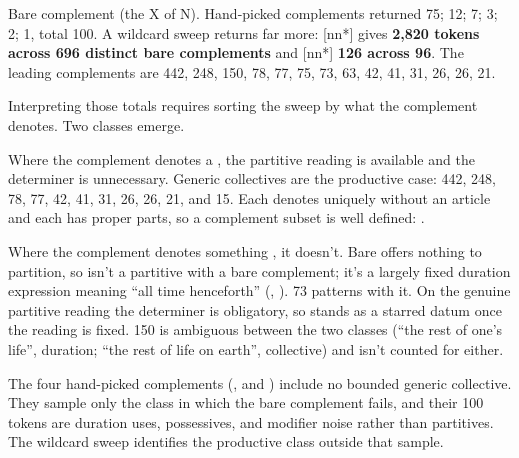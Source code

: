 Bare complement (the X of N). Hand-picked complements returned  75;  12;  7;  3;  2;  1, total 100. A wildcard sweep returns far more:  [nn*] gives \textbf{2,820 tokens across 696 distinct bare complements} and  [nn*] \textbf{126 across 96}. The leading complements are  442,  248,  150,  78,  77,  75,  73,  63,  42,  41,  31,  26,  26,  21.

Interpreting those totals requires sorting the sweep by what the complement denotes. Two classes emerge.

Where the complement denotes a , the partitive reading is available and the determiner is unnecessary. Generic collectives are the productive case:  442,  248,  78,  77,  42,  41,  31,  26,  26,  21, and  15. Each denotes uniquely without an article and each has proper parts, so a complement subset is well defined: .

Where the complement denotes something , it doesn't. Bare  offers nothing to partition, so  isn't a partitive with a bare complement; it's a largely fixed duration expression meaning \enquote{all time henceforth} (, ).  73 patterns with it. On the genuine partitive reading the determiner is obligatory, so  stands as a starred datum once the reading is fixed.  150 is ambiguous between the two classes (\enquote{the rest of one's life}, duration; \enquote{the rest of life on earth}, collective) and isn't counted for either.

The four hand-picked complements (, and ) include no bounded generic collective. They sample only the class in which the bare complement fails, and their 100 tokens are duration uses, possessives, and modifier noise rather than partitives. The wildcard sweep identifies the productive class outside that sample.

